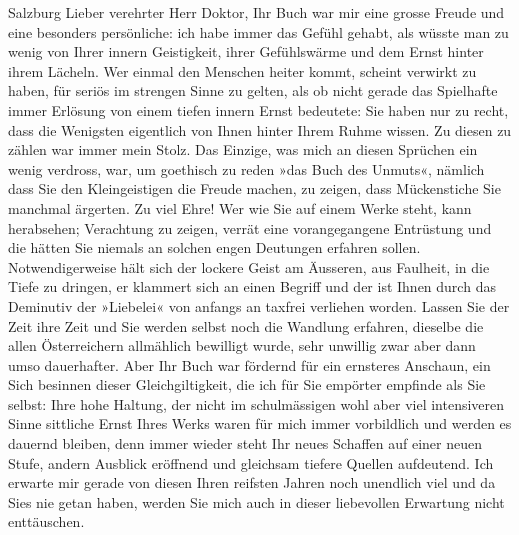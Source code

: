 \pstart
           \raggedleft{}Salzburg\pend
           \vspace{0.5em}
\pstart
           Lieber verehrter Herr Doktor, Ihr Buch war mir eine grosse Freude und eine besonders
               persönliche: ich habe immer das Gefühl gehabt, als wüsste man zu wenig von Ihrer
               innern Geistigkeit, ihrer Gefühlswärme und dem Ernst hinter ihrem Lächeln. Wer einmal
               den Menschen heiter kommt, scheint verwirkt zu haben, für seriös im strengen Sinne zu
               gelten, als ob nicht gerade das Spielhafte immer Erlösung von einem tiefen innern
               Ernst bedeutete: Sie haben nur zu recht, dass die Wenigsten eigentlich von Ihnen
               hinter Ihrem Ruhme wissen. Zu diesen zu zählen war immer mein Stolz. Das Einzige, was
               mich an diesen Sprüchen ein wenig
               verdross, war, um goethisch zu reden
               »das Buch des Unmuts«, nämlich dass Sie den Kleingeistigen die Freude machen, zu
               zeigen, dass Mückenstiche Sie manchmal ärgerten. Zu viel Ehre! Wer wie Sie auf einem
               Werke steht, kann herabsehen; Verachtung zu zeigen, verrät eine vorangegangene
               Entrüstung und die hätten Sie niemals an solchen engen Deutungen erfahren sollen.
               Notwendigerweise hält sich der lockere Geist am Äusseren, aus Faulheit, in die Tiefe
               zu dringen, er klammert sich an einen Begriff und der ist Ihnen durch das Deminutiv
               der »Liebelei« von anfangs an taxfrei
               verliehen worden. Lassen Sie der Zeit ihre Zeit und Sie werden selbst noch die
               Wandlung erfahren, dieselbe die allen Österreichern
               allmählich bewilligt wurde, sehr unwillig zwar aber dann umso dauerhafter. Aber Ihr
               Buch war fördernd für ein ernsteres
               Anschaun, ein Sich besinnen dieser Gleichgiltigkeit, die ich für Sie empörter
               empfinde als Sie selbst: Ihre hohe Haltung, der nicht im schulmässigen wohl aber viel
               intensiveren Sinne sittliche Ernst Ihres Werks waren für mich immer vorbildlich und
               werden es dauernd bleiben, denn immer wieder steht Ihr neues Schaffen auf einer neuen
               Stufe, andern Ausblick eröffnend und gleichsam tiefere Quellen aufdeutend. Ich
               erwarte mir gerade von diesen Ihren reifsten Jahren noch unendlich viel und da Sies
               nie getan haben, werden Sie mich auch in dieser liebevollen Erwartung nicht
               enttäuschen.\pend
           
